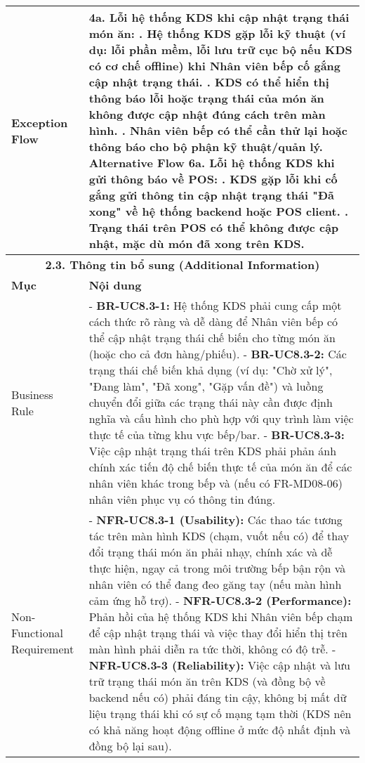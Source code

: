 \begin{longtable}{|m{4cm}|p{11cm}|}
\hline
Exception Flow & \textbf{4a. Lỗi hệ thống KDS khi cập nhật trạng thái món ăn:} \newline    1. Hệ thống KDS gặp lỗi kỹ thuật (ví dụ: lỗi phần mềm, lỗi lưu trữ cục bộ nếu KDS có cơ chế offline) khi Nhân viên bếp cố gắng cập nhật trạng thái. \newline    2. KDS có thể hiển thị thông báo lỗi hoặc trạng thái của món ăn không được cập nhật đúng cách trên màn hình. \newline    3. Nhân viên bếp có thể cần thử lại hoặc thông báo cho bộ phận kỹ thuật/quản lý. \newline \textbf{Alternative Flow 6a. Lỗi hệ thống KDS khi gửi thông báo về POS:} \newline    1. KDS gặp lỗi khi cố gắng gửi thông tin cập nhật trạng thái "Đã xong" về hệ thống backend hoặc POS client. \newline    2. Trạng thái trên POS có thể không được cập nhật, mặc dù món đã xong trên KDS. \\
\hline
\multicolumn{2}{|c|}{\textbf{2.3. Thông tin bổ sung (Additional Information)}} \\
\hline
\textbf{Mục} & \textbf{Nội dung} \\
\hline
Business Rule & - \textbf{BR-UC8.3-1:} Hệ thống KDS phải cung cấp một cách thức rõ ràng và dễ dàng để Nhân viên bếp có thể cập nhật trạng thái chế biến cho từng món ăn (hoặc cho cả đơn hàng/phiếu). \newline - \textbf{BR-UC8.3-2:} Các trạng thái chế biến khả dụng (ví dụ: "Chờ xử lý", "Đang làm", "Đã xong", "Gặp vấn đề") và luồng chuyển đổi giữa các trạng thái này cần được định nghĩa và cấu hình cho phù hợp với quy trình làm việc thực tế của từng khu vực bếp/bar. \newline - \textbf{BR-UC8.3-3:} Việc cập nhật trạng thái trên KDS phải phản ánh chính xác tiến độ chế biến thực tế của món ăn để các nhân viên khác trong bếp và (nếu có FR-MD08-06) nhân viên phục vụ có thông tin đúng. \\
\hline
Non-Functional Requirement & - \textbf{NFR-UC8.3-1 (Usability):} Các thao tác tương tác trên màn hình KDS (chạm, vuốt nếu có) để thay đổi trạng thái món ăn phải nhạy, chính xác và dễ thực hiện, ngay cả trong môi trường bếp bận rộn và nhân viên có thể đang đeo găng tay (nếu màn hình cảm ứng hỗ trợ). \newline - \textbf{NFR-UC8.3-2 (Performance):} Phản hồi của hệ thống KDS khi Nhân viên bếp chạm để cập nhật trạng thái và việc thay đổi hiển thị trên màn hình phải diễn ra tức thời, không có độ trễ. \newline - \textbf{NFR-UC8.3-3 (Reliability):} Việc cập nhật và lưu trữ trạng thái món ăn trên KDS (và đồng bộ về backend nếu có) phải đáng tin cậy, không bị mất dữ liệu trạng thái khi có sự cố mạng tạm thời (KDS nên có khả năng hoạt động offline ở mức độ nhất định và đồng bộ lại sau). \\
\hline
\end{longtable}

